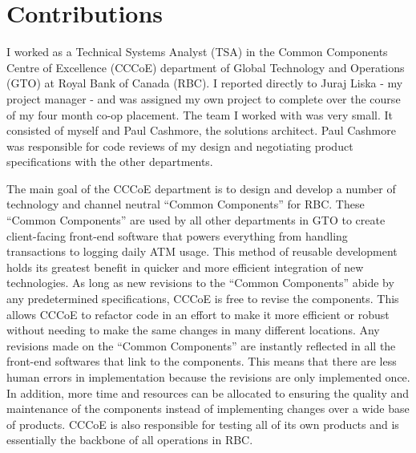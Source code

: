 \section*{Contributions} %
\label{sec:contributions}

I worked as a Technical Systems Analyst (TSA) in the Common Components Centre of Excellence (CCCoE) department of Global Technology and Operations (GTO) at Royal Bank of Canada (RBC).  I reported directly to Juraj Liska - my project manager - and was assigned my own project to complete over the course of my four month co-op placement.  The team I worked with was very small. It consisted of myself and Paul Cashmore, the solutions architect.  Paul Cashmore was responsible for code reviews of my design and negotiating product specifications with the other departments.\newline

The main goal of the CCCoE department is to design and develop a number of technology and channel neutral ``Common Components'' for RBC.  These ``Common Components'' are used by all other departments in GTO to create client-facing front-end software that powers everything from handling transactions to logging daily ATM usage. This method of reusable development holds its greatest benefit in quicker and more efficient integration of new technologies. As long as new revisions to the ``Common Components'' abide by any predetermined specifications, CCCoE is free to revise the components. This allows CCCoE to refactor code in an effort to make it more efficient or robust without needing to make the same changes in many different locations. Any revisions made on the ``Common Components'' are instantly reflected in all the front-end softwares that link to the components. This means that there are less human errors in implementation because the revisions are only implemented once. In addition, more time and resources can be allocated to ensuring the quality and maintenance of the components instead of implementing changes over a wide base of products. CCCoE is also responsible for testing all of its own products and is essentially the backbone of all operations in RBC.\newline


